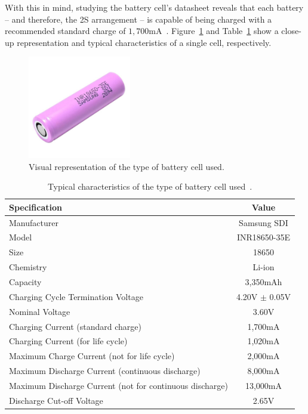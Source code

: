 With this in mind, studying the battery cell's datasheet reveals that each battery -- and therefore, the 2S arrangement -- is capable of being charged with a recommended standard charge of $1,700$mA~\cite{INR18650-35E}.
Figure~\ref{fig:battery2S} and Table~\ref{tab:battery2S} show a close-up representation and typical characteristics of a single cell, respectively.


\begin{figure}[h]
	\centering
	\includegraphics[width=0.4\textwidth]{Chapters/Figures/chapter3/bateria-li-ion-mr-18650-3-6v-3500mah-samsung-inr18650-35e.jpg}
	\caption{Visual representation of the type of battery cell used.}
	\label{fig:battery2S}
\end{figure}

\begingroup
\begin{table}[h]
	\caption{Typical characteristics of the type of battery cell used~\cite{INR18650-35E}.}
	\label{tab:battery2S}
	\centering%
	\begin{tabular}{lc}
        \toprule
        \textbf{Specification} & \textbf{Value} \\
        \midrule
        Manufacturer & Samsung SDI \\
        \midrule
        Model & INR18650-35E \\
        \midrule
		Size & 18650 \\
		\midrule
		Chemistry & Li-ion \\
		\midrule
		Capacity & 3,350mAh \\
        \midrule
		Charging Cycle Termination Voltage & 4.20V $\pm$ 0.05V \\
		\midrule
		Nominal Voltage & 3.60V \\
        \midrule
		Charging Current (standard charge) & 1,700mA\\
		\midrule
		Charging Current (for life cycle) & 1,020mA\\
		\midrule
		Maximum Charge Current (not for life cycle) & 2,000mA \\
		\midrule
		Maximum Discharge Current (continuous discharge) & 8,000mA \\
		\midrule
		Maximum Discharge Current (not for continuous discharge) & 13,000mA \\
		\midrule
		Discharge Cut-off Voltage & 2.65V \\
        \bottomrule
    \end{tabular}
\end{table}
\endgroup

